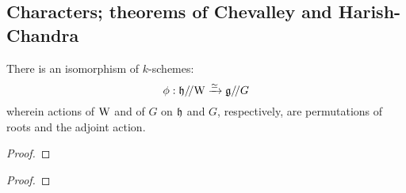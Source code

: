    \subsection{Characters; theorems of Chevalley and Harish-Chandra}
        \begin{theorem} \label{theorem: chevalley_isomorphism}
            There is an isomorphism of $k$-schemes:
                $$\phi: \mathfrak{h}/\!/\mathrm{W} \xrightarrow[]{\simeq} \mathfrak{g}/\!/G$$
            wherein actions of $\mathrm{W}$ and of $G$ on $\mathfrak{h}$ and $G$, respectively, are permutations of roots and the adjoint action. 
        \end{theorem}
            \begin{proof}
                
            \end{proof}
        \begin{theorem} \label{theorem: harish_chandra_isomorphism}
            
        \end{theorem}
            \begin{proof}
                
            \end{proof}

